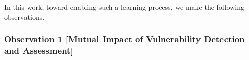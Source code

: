 In this work, toward enabling such a learning process, we make the
following observations.







\subsubsection{Observation 1 [Mutual Impact of Vulnerability
    Detection and Assessment]}

